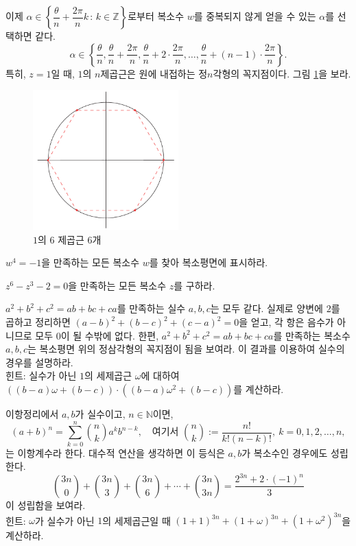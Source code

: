 이제 $\alpha \in \left\{ \dfrac{\theta}{n}+ \dfrac{2\pi}{n}k \,:\, k\in\mathbb Z \right\}$로부터
복소수 $w$를 중복되지 않게 얻을 수 있는 $\alpha$를 선택하면 같다.
$$
\alpha \in \left\{
\dfrac\theta n,  \dfrac\theta n+ \dfrac{2\pi}n, \dfrac\theta n + 2\cdot \dfrac{2\pi}n, \ldots,
\dfrac\theta n+ (n-1)\cdot \dfrac{2\pi}n
\right\}.
$$
특히, $z=1$일 때, $1$의 $n$제곱근은 원에 내접하는 정$n$각형의 꼭지점이다.
그림 \ref{fig-1-8}을 보라.
\begin{figure}[!h]
\begin{center}
\includegraphics[width=0.5\textwidth]{./SaltChapter/figs/fig-1-8}
\end{center}
\caption{$1$의 $6$ 제곱근 $6$개}
\label{fig-1-8}
\end{figure}

\begin{salt_exercise} \label{ex-1-9}
$w^4=-1$을 만족하는 모든 복소수 $w$를 찾아
복소평면에 표시하라.
\end{salt_exercise}

\begin{salt_exercise} \label{ex-1-10}
$z^6-z^3-2=0$을 만족하는 모든 복소수 $z$를 구하라.
\end{salt_exercise}

\begin{salt_exercise} \label{ex-1-11}
$a^2+b^2+c^2= ab+bc+ca$를 만족하는 실수 $a,b,c$는 모두 같다.
실제로 양변에 $2$를 곱하고 정리하면
$(a-b)^2+(b-c)^2+(c-a)^2=0$을 얻고, 
각 항은 음수가 아니므로 모두 $0$이 될 수밖에 없다.
한편, $a^2+b^2+c^2= ab+bc+ca$를 만족하는 복소수 $a,b,c$는
복소평면 위의 정삼각형의 꼭지점이 됨을 보여라.
이 결과를 이용하여 실수의 경우를 설명하라. \\[1ex]
힌트: 실수가 아닌 $1$의 세제곱근 $\omega$에 대하여
$((b-a)\omega + (b-c))\cdot((b-a)\omega^2 + (b-c))$를 계산하라.
\end{salt_exercise}

\begin{salt_exercise} \label{ex-1-12}
이항정리에서
$a,b$가 실수이고, $n\in\mathbb N$이면,
$$
(a+b)^n = \sum_{k=0}^n {n \choose k}a^kb^{n-k},
\quad
\text{여기서 }
{n \choose k} := \frac{n!}{k!(n-k)!}, \
k=0,1,2,\ldots, n,
$$
는 이항계수라 한다.
대수적 연산을 생각하면 이 등식은 $a,b$가 복소수인 경우에도 성립한다.
$$
{3n \choose 0} + {3n \choose 3} + {3n \choose 6} + \cdots
+ {3n \choose 3n} = \dfrac{2^{3n} + 2\cdot(-1)^n}3
$$
이 성립함을 보여라. \\[1ex]
힌트: $\omega$가 실수가 아닌 $1$의 세제곱근일 때
$(1+1)^{3n} + (1+\omega)^{3n} + (1+\omega^2)^{3n}$을 계산하라.
\end{salt_exercise}

